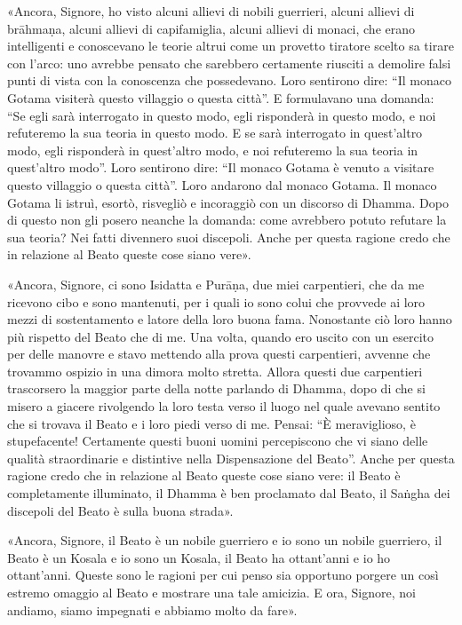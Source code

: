 «Ancora, Signore, ho visto alcuni allievi di nobili guerrieri, alcuni
allievi di brāhmaṇa, alcuni allievi di capifamiglia, alcuni allievi di
monaci, che erano intelligenti e conoscevano le teorie altrui come un
provetto tiratore scelto sa tirare con l’arco: uno avrebbe pensato che
sarebbero certamente riusciti a demolire falsi punti di vista con la
conoscenza che possedevano. Loro sentirono dire: “Il monaco Gotama
visiterà questo villaggio o questa città”. E formulavano una domanda:
“Se egli sarà interrogato in questo modo, egli risponderà in questo
modo, e noi refuteremo la sua teoria in questo modo. E se sarà
interrogato in quest’altro modo, egli risponderà in quest’altro modo, e
noi refuteremo la sua teoria in quest’altro modo”. Loro sentirono dire:
“Il monaco Gotama è venuto a visitare questo villaggio o questa città”.
Loro andarono dal monaco Gotama. Il monaco Gotama li istruì, esortò,
risvegliò e incoraggiò con un discorso di Dhamma. Dopo di questo non gli
posero neanche la domanda: come avrebbero potuto refutare la sua teoria?
Nei fatti divennero suoi discepoli. Anche per questa ragione credo che
in relazione al Beato queste cose siano vere».


«Ancora, Signore, ci sono Isidatta e Purāṇa, due miei carpentieri, che
da me ricevono cibo e sono mantenuti, per i quali io sono colui che
provvede ai loro mezzi di sostentamento e latore della loro buona fama.
Nonostante ciò loro hanno più rispetto del Beato che di me. Una volta,
quando ero uscito con un esercito per delle manovre e stavo mettendo
alla prova questi carpentieri, avvenne che trovammo ospizio in una
dimora molto stretta. Allora questi due carpentieri trascorsero la
maggior parte della notte parlando di Dhamma, dopo di che si misero a
giacere rivolgendo la loro testa verso il luogo nel quale avevano
sentito che si trovava il Beato e i loro piedi verso di me. Pensai: “È
meraviglioso, è stupefacente! Certamente questi buoni uomini
percepiscono che vi siano delle qualità straordinarie e distintive nella
Dispensazione del Beato”. Anche per questa ragione credo che in
relazione al Beato queste cose siano vere: il Beato è completamente
illuminato, il Dhamma è ben proclamato dal Beato, il Saṅgha dei
discepoli del Beato è sulla buona strada».


«Ancora, Signore, il Beato è un nobile guerriero e io sono un nobile
guerriero, il Beato è un Kosala e io sono un Kosala, il Beato ha
ottant’anni e io ho ottant’anni. Queste sono le ragioni per cui penso
sia opportuno porgere un così estremo omaggio al Beato e mostrare una
tale amicizia. E ora, Signore, noi andiamo, siamo impegnati e abbiamo
molto da fare».


